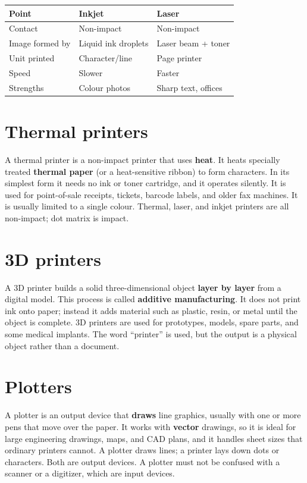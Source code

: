 \begin{center}
\begin{tabular}{lll}
\toprule
\textbf{Point} & \textbf{Inkjet} & \textbf{Laser} \\
\midrule
Contact & Non-impact & Non-impact \\
Image formed by & Liquid ink droplets & Laser beam + toner \\
Unit printed & Character/line & Page printer \\
Speed & Slower & Faster \\
Strengths & Colour photos & Sharp text, offices \\
\bottomrule
\end{tabular}
\end{center}

\section{Thermal printers}
A thermal printer is a non-impact printer that uses \textbf{heat}. It heats
specially treated \textbf{thermal paper} (or a heat-sensitive ribbon) to form
characters. In its simplest form it needs no ink or toner cartridge, and it
operates silently. It is used for point-of-sale receipts, tickets, barcode
labels, and older fax machines. It is usually limited to a single colour.
Thermal, laser, and inkjet printers are all non-impact; dot matrix is impact.

\section{3D printers}
A 3D printer builds a solid three-dimensional object \textbf{layer by layer}
from a digital model. This process is called \textbf{additive
manufacturing}. It does not print ink onto paper; instead it adds material
such as plastic, resin, or metal until the object is complete. 3D printers
are used for prototypes, models, spare parts, and some medical implants. The
word ``printer'' is used, but the output is a physical object rather than a
document.

\section{Plotters}
A plotter is an output device that \textbf{draws} line graphics, usually with
one or more pens that move over the paper. It works with \textbf{vector}
drawings, so it is ideal for large engineering drawings, maps, and CAD plans,
and it handles sheet sizes that ordinary printers cannot. A plotter draws
lines; a printer lays down dots or characters. Both are output devices. A
plotter must not be confused with a scanner or a digitizer, which are input
devices.

